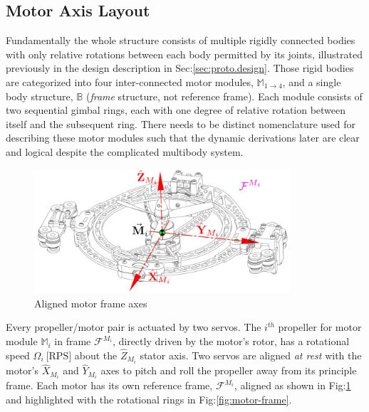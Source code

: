 \subsection{Motor Axis Layout}
\label{subsec:proto.conventions.motoraxis}
Fundamentally the whole structure consists of multiple rigidly connected bodies with only relative rotations between each body permitted by its joints, illustrated previously in the design description in Sec:\ref{sec:proto.design}. Those rigid bodies are categorized into four inter-connected motor modules, $\mathbb{M}_{1\rightarrow 4}$, and a single body structure, $\mathbb{B}$ (\emph{frame} structure, not reference frame). Each module consists of two sequential gimbal rings, each with one degree of relative rotation between itself and the subsequent ring. There needs to be distinct nomenclature used for describing these motor modules such that the dynamic derivations later are clear and logical despite the complicated multibody system. 
\begin{figure}[htbp]
\centering
\includegraphics[width=0.85\textwidth]{figs/motor-axes}
\caption{Aligned motor frame axes}
\label{fig:motor-axes}
\vspace{-10pt}
\end{figure}
\par
Every propeller/motor pair is actuated by two servos. The $i^{th}$ propeller for motor module $\mathbb{M}_i$ in frame $\mathcal{F}^{M_i}$, directly driven by the motor's rotor, has a rotational speed $\Omega_i~\text{[RPS]}$ about the $\hat{Z}_{M_i}$ stator axis. Two servos are aligned \emph{at rest} with the motor's $\hat{X}_{M_i}$ and $\hat{Y}_{M_i}$ axes to pitch and roll the propeller away from its principle frame. Each motor has its own reference frame, $\mathcal{F}^{M_i}$, aligned as shown in Fig:\ref{fig:motor-axes} and highlighted with the rotational rings in Fig:\ref{fig:motor-frame}.
\par
